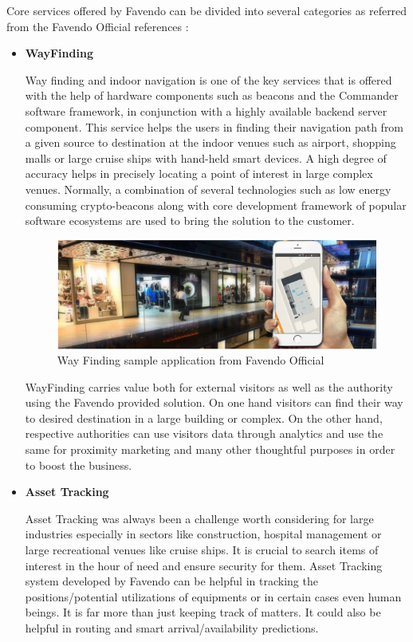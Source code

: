 \par Core services offered by Favendo can be divided into several categories as referred from the Favendo Official references \cite{favendoataglance}:
\begin{itemize}
	\item \textbf{WayFinding}
	\par Way finding and indoor navigation is one of the key services that is offered with the help of hardware components such as beacons and the Commander software framework, in conjunction with a highly available backend server component. This service helps the users in finding their navigation path from a given source to destination at the indoor venues such as airport, shopping malls or large cruise ships with hand-held  smart devices. A high degree of accuracy helps in precisely locating a point of interest in large complex venues. Normally, a combination of several technologies such as low energy consuming crypto-beacons along with core development framework of popular software ecosystems are used to bring the solution to the customer.
	\begin{figure}[H]
		\centering
		\includegraphics[scale = 0.3]{images/wayfinding}
		\caption{Way Finding sample application from Favendo Official \cite{favendoataglance}}
		\label{figure:wayfinding_sample}
	\end{figure}
	\par WayFinding carries value both for external visitors as well as the authority using the Favendo provided solution. On one hand visitors can find their way to desired destination in a large building or complex. On the other hand, respective authorities can use visitors data through analytics and use the same for proximity marketing and many other thoughtful purposes in order to boost the business.
	\item \textbf{Asset Tracking}
	\par Asset Tracking was always been a challenge worth considering for large industries especially in sectors like construction, hospital management or large recreational venues like cruise ships. It is crucial to search items of interest in the hour of need and ensure security for them. Asset Tracking system developed by Favendo can be helpful in tracking the positions/potential utilizations of equipments or in certain cases even human beings. It is far more than just keeping track of matters. It could also be helpful in routing and smart arrival/availability predictions.

\end{itemize}
